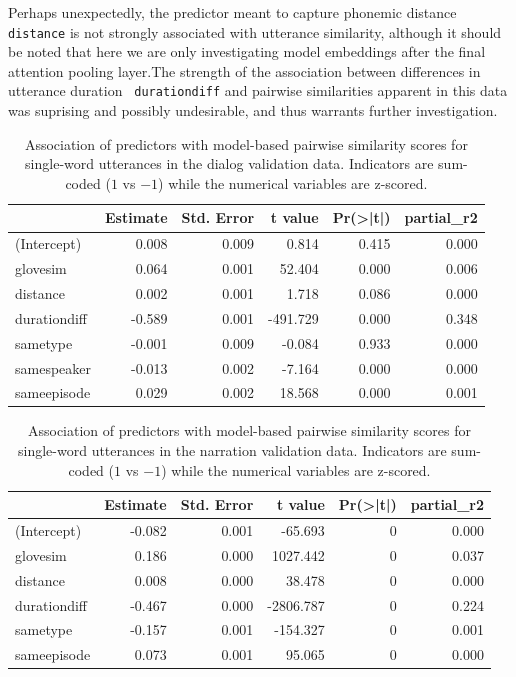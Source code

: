 Perhaps unexpectedly, the predictor meant to capture phonemic distance
{\tt distance} is not strongly associated with utterance similarity,
although it should be noted that here we are only investigating model
embeddings after the final attention pooling layer.The strength of
the association between differences in utterance duration {\tt
  durationdiff} and pairwise similarities apparent in this data was
suprising and possibly undesirable, and thus warrants further investigation.



\begin{table}
  \centering
\begin{tabular}{lrrrrr}
\toprule
  & Estimate & Std. Error & t value & Pr(>|t|) & partial\_r2\\
\midrule
(Intercept) & 0.008 & 0.009 & 0.814 & 0.415 & 0.000\\
glovesim & 0.064 & 0.001 & 52.404 & 0.000 & 0.006\\
distance & 0.002 & 0.001 & 1.718 & 0.086 & 0.000\\
durationdiff & -0.589 & 0.001 & -491.729 & 0.000 & 0.348\\
sametype & -0.001 & 0.009 & -0.084 & 0.933 & 0.000\\
\addlinespace
samespeaker & -0.013 & 0.002 & -7.164 & 0.000 & 0.000\\
sameepisode & 0.029 & 0.002 & 18.568 & 0.000 & 0.001\\
\bottomrule
\end{tabular}
\caption{Association of predictors with model-based pairwise
  similarity scores for single-word utterances in the dialog
  validation data. Indicators are sum-coded ($1$ vs $-1$) while the
  numerical variables are z-scored.}
\label{tab:dialog-lm}
\end{table}



\begin{table}
  \centering

\begin{tabular}{lrrrrr}
\toprule
  & Estimate & Std. Error & t value & Pr(>|t|) & partial\_r2\\
\midrule
(Intercept) & -0.082 & 0.001 & -65.693 & 0 & 0.000\\
glovesim & 0.186 & 0.000 & 1027.442 & 0 & 0.037\\
distance & 0.008 & 0.000 & 38.478 & 0 & 0.000\\
durationdiff & -0.467 & 0.000 & -2806.787 & 0 & 0.224\\
sametype & -0.157 & 0.001 & -154.327 & 0 & 0.001\\
\addlinespace
sameepisode & 0.073 & 0.001 & 95.065 & 0 & 0.000\\
\bottomrule
\end{tabular}
\caption{Association of predictors with model-based pairwise
  similarity scores for single-word utterances in the narration
  validation data. Indicators are sum-coded ($1$ vs $-1$) while the
  numerical variables are z-scored.}
\label{tab:narration-lm}
\end{table}

